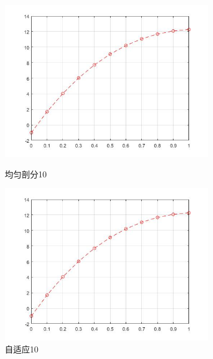 \documentclass[12pt]{ctexart}
\begin{document}
\begin{figure}[H]
	\centering
	\begin{minipage}[t]{0.48\textwidth}
		\centering
		\includegraphics[width=9cm]{方程三，均匀剖分10.jpg}
		\caption{均匀剖分10}
	\end{minipage}
	\begin{minipage}[t]{0.48\textwidth}
		\centering
		\includegraphics[width=9cm]{方程三，自适应10.jpg}
		\caption{自适应10}
	\end{minipage}
\end{figure}
\end{document}
